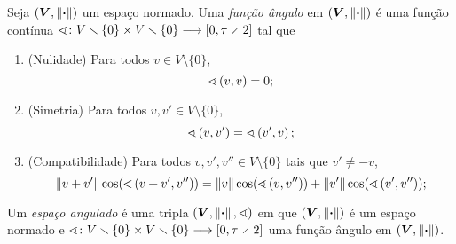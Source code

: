 \begin{definition}
Seja $(\bm V, \left\Vert{\bm{\cdot}}\right\Vert)$ um espaço normado. Uma \emph{função ângulo} em $(\bm V, \left\Vert{\bm{\cdot}}\right\Vert)$ é uma função contínua $\fun{\angf}{V \setminus \{0\} \times V \setminus \{0\}}{\intff{0}{\tau \div 2}}$ tal que
	\begin{enumerate}
		\item (Nulidade) Para todos $v \in V \setminus \{0\}$,
			\begin{equation*}
				\sphericalangle\left({v},{v}\right) = 0;
			\end{equation*}
		\item (Simetria) Para todos $v,v' \in V \setminus \{0\}$,
			\begin{equation*}
				\sphericalangle\left({v},{v'}\right) = \sphericalangle\left({v'},{v}\right);
			\end{equation*}
		\item (Compatibilidade) Para todos $v,v',v'' \in V \setminus \{0\}$ tais que $v' \neq -v$,
			\begin{equation*}
				\left\Vert{v+v'}\right\Vert\cos(\sphericalangle\left({v+v'},{v''}\right)) = \left\Vert{v}\right\Vert\cos(\sphericalangle\left({v},{v''}\right)) + \left\Vert{v'}\right\Vert\cos(\sphericalangle\left({v'},{v''}\right));
			\end{equation*}
	\end{enumerate}
Um \emph{espaço angulado} é uma tripla $(\bm V, \left\Vert{\bm{\cdot}}\right\Vert,\sphericalangle)$ em que $(\bm V, \left\Vert{\bm{\cdot}}\right\Vert)$ é um espaço normado e $\fun{\angf}{V \setminus \{0\} \times V \setminus \{0\}}{\intff{0}{\tau \div 2}}$ uma função ângulo em $(\bm V, \left\Vert{\bm{\cdot}}\right\Vert)$.
\end{definition}

